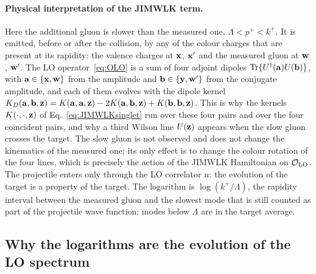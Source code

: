\paragraph{Physical interpretation of the JIMWLK term.} Here the additional gluon is slower than the measured one, $\Lambda<p^+<k^+$. It is emitted, before or after the collision, by any of the colour charges that are present at its rapidity: the valence charges at $\mathbf{x}$, $\mathbf{x}'$ and the measured gluon at $\mathbf{w}$, $\mathbf{w}'$. The LO operator~\eqref{eq:OLO} is a sum of four adjoint dipoles ${\rm Tr}\{U^\dagger(\mathbf{a})U(\mathbf{b})\}$, with $\mathbf{a}\in\{\mathbf{x},\mathbf{w}\}$ from the amplitude and $\mathbf{b}\in\{\mathbf{y},\mathbf{w}'\}$ from the conjugate amplitude, and each of them evolves with the dipole kernel $K_D(\mathbf{a},\mathbf{b},\mathbf{z})=K(\mathbf{a},\mathbf{a},\mathbf{z})-2K(\mathbf{a},\mathbf{b},\mathbf{z})+K(\mathbf{b},\mathbf{b},\mathbf{z})$. This is why the kernels $K(\cdot,\cdot,\mathbf{z})$ of Eq.~\eqref{eq:JIMWLKsinglet} run over these four pairs and over the four coincident pairs, and why a third Wilson line $U(\mathbf{z})$ appears when the slow gluon crosses the target. The slow gluon is not observed and does not change the kinematics of the measured one; its only effect is to change the colour rotation of the four lines, which is precisely the action of the JIMWLK Hamiltonian on $\mathcal O_{\rm LO}$. The projectile enters only through the LO correlator $n$: the evolution of the target is a property of the target. The logarithm is $\log(k^+/\Lambda)$, the rapidity interval between the measured gluon and the slowest mode that is still counted as part of the projectile wave function; modes below $\Lambda$ are in the target average.

\subsection{Why the logarithms are the evolution of the LO spectrum}\label{sec:proofsketch}


